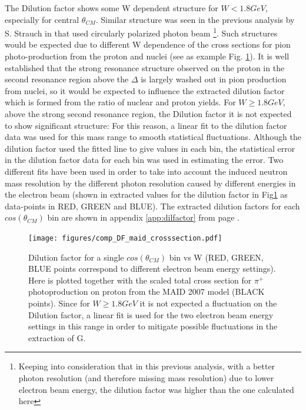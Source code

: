 The Dilution factor shows some W dependent structure for $W < 1.8GeV$, especially for central $\theta_{CM}$. Similar structure was seen in the previous analysis by S. Strauch in \cite{Strauch_2014} that used circularly polarized photon beam \footnote{Keeping into consideration that in this previous analysis, with a better photon resolution (and therefore missing mass resolution) due to lower electron beam energy, the dilution factor was higher than the one calculated here}. Such structures would be expected due to different W dependence of the cross sections for pion photo-production from the proton and nuclei (see as example Fig. \ref{fig:comparison_dilutionfactor}). It is well established that the strong resonance structure observed on the proton in the second resonance region above the $\Delta$  is largely washed out in pion production from nuclei, so it would be expected to influence the extracted dilution factor which is formed from the ratio of nuclear and proton yields. For $W \geq 1.8GeV$, above the strong second resonance region, the Dilution factor it is not expected to show significant structure: For this reason, a linear fit to the dilution factor data was used for this mass range to smooth statistical fluctuations. Although the dilution factor used the fitted line to give values in each bin, the statistical error in the dilution factor data for each bin was used in estimating the error. Two different fits have been used in order to take into account the induced neutron mass resolution by the different photon resolution caused by different energies in the electron beam (shown in extracted values for the dilution factor in Fig\ref{fig:comparison_dilutionfactor} as data-points in RED, GREEN and BLUE). The extracted dilution factors for each $cos(\theta_{CM})$ bin are shown in  appendix \ref{app:dilfactor} from page \pageref{app:dilfactor}.  

\begin{figure}[H]
  \begin{center}
    \texttt{[image: figures/comp\_DF\_maid\_crosssection.pdf]} \\
    \caption{Dilution factor for a single $cos(\theta_{CM})$ bin vs W (RED, GREEN, BLUE points correspond to different electron beam energy settings). Here is plotted together with the scaled total cross section for $\pi^+$ photoproduction on proton from the MAID 2007 model \cite{MAID_2007} (BLACK points). Since for $W \geq 1.8GeV$ it is not expected a fluctuation on the Dilution factor, a linear fit is used for the two electron beam energy settings in this range in order to mitigate possible fluctuations in the extraction of G.}
    \label{fig:comparison_dilutionfactor}
  \end{center}
\end{figure}


